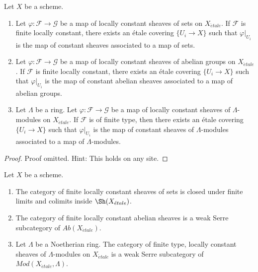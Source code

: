 \begin{lemma}
\label{lemma-morphism-locally-constant}
Let $X$ be a scheme.
\begin{enumerate}
\item Let $\varphi : \mathcal{F} \to \mathcal{G}$ be a map
of locally constant sheaves of sets on $X_{\acute{e}tale}$.
If $\mathcal{F}$ is finite locally constant, there exists an
\'etale covering $\{U_i \to X\}$ such that
$\varphi|_{U_i}$ is the map of constant sheaves associated to
a map of sets.
\item Let $\varphi : \mathcal{F} \to \mathcal{G}$ be a map
of locally constant sheaves of abelian groups on $X_{\acute{e}tale}$.
If $\mathcal{F}$ is finite locally constant, there exists an \'etale
covering $\{U_i \to X\}$ such that $\varphi|_{U_i}$ is the map of
constant abelian sheaves associated to a map of abelian groups.
\item Let $\Lambda$ be a ring.
Let $\varphi : \mathcal{F} \to \mathcal{G}$ be a map
of locally constant sheaves of $\Lambda$-modules on $X_{\acute{e}tale}$.
If $\mathcal{F}$ is of finite type, then there exists an \'etale covering
$\{U_i \to X\}$ such that $\varphi|_{U_i}$ is the map of constant
sheaves of $\Lambda$-modules associated to a map of $\Lambda$-modules.
\end{enumerate}
\end{lemma}

\begin{proof}
Proof omitted. Hint: This holds on any site.
\end{proof}

\begin{lemma}
\label{lemma-kernel-finite-locally-constant}
Let $X$ be a scheme.
\begin{enumerate}
\item The category of finite locally constant sheaves of sets
is closed under finite limits and colimits inside $\Sh(X_{\acute{e}tale})$.
\item The category of finite locally constant abelian sheaves is a
weak Serre subcategory of $\textit{Ab}(X_{\acute{e}tale})$.
\item Let $\Lambda$ be a Noetherian ring. The category of
finite type, locally constant sheaves of $\Lambda$-modules on
$X_{\acute{e}tale}$ is a weak Serre subcategory of
$\textit{Mod}(X_{\acute{e}tale}, \Lambda)$.
\end{enumerate}
\end{lemma}

